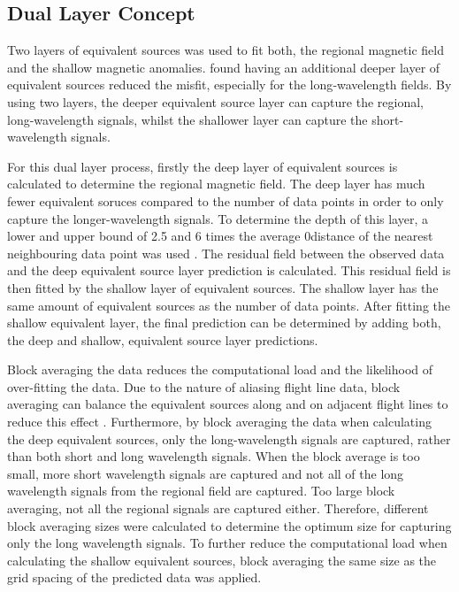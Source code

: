 \subsection{Dual Layer Concept}
Two layers of equivalent sources was used to fit both, the regional magnetic field and the shallow magnetic anomalies. \citep{Li2019} found having an additional deeper layer of equivalent sources reduced the misfit, especially for the long‐wavelength fields. By using two layers, the deeper equivalent source layer can capture the regional, long-wavelength signals, whilst the shallower layer can capture the short-wavelength signals.

For this dual layer process, firstly the deep layer of equivalent sources is calculated to determine the regional magnetic field. The deep layer has much fewer equivalent soruces compared to the number of data points in order to only capture the longer-wavelength signals. To determine the depth of this layer, a lower and upper bound of 2.5 and 6 times the average 0distance of the nearest neighbouring data point was used \citep{Dampney1969}. The residual field between the observed data and the deep equivalent source layer prediction is calculated. This residual field is then fitted by the shallow layer of equivalent sources. The shallow layer has the same amount of equivalent sources as the number of data points. After fitting the shallow equivalent layer, the final prediction can be determined by adding both, the deep and shallow, equivalent source layer predictions.

Block averaging the data reduces the computational load and the likelihood of over-fitting the data. Due to the nature of aliasing flight line data, block averaging can balance the equivalent sources along and on adjacent flight lines to reduce this effect \citep{SolerUieda2021}. Furthermore, by block averaging the data when calculating the deep equivalent sources, only the long-wavelength signals are captured, rather than both short and long wavelength signals. When the block average is too small, more short wavelength signals are captured and not all of the long wavelength signals from the regional field are captured. Too large block averaging, not all the regional signals are captured either. Therefore, different block averaging sizes were calculated to determine the optimum size for capturing only the long wavelength signals. To further reduce the computational load when calculating the shallow equivalent sources, block averaging the same size as the grid spacing of the predicted data was applied.

